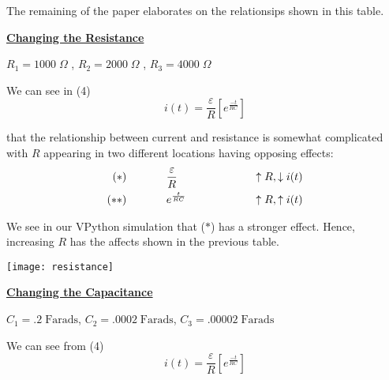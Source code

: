 \documentclass[11pt]{article}
\begin{document}
\noindent The remaining of the paper elaborates on the relationsips shown in this table. 


\newpage

\begin{center}
{\bf\underline{Changing the Resistance}}
\end{center}

\begin{center}
$R_1=1000\;\Omega$ , $R_2=2000\;\Omega$ , $R_3=4000\;\Omega$
\end{center}
\vspace{.1in}

\noindent We can see in (4) 
\[
i(t)=\frac{\varepsilon}{R}\left[e^{\frac{-t}{RC}}\right]
\]
\vspace{.1in}

\noindent that the relationship between current and resistance is somewhat complicated with $R$ appearing in two different locations having opposing effects:
\begin{align*}
(*)	& \hspace{.5in}\frac{\varepsilon}{R}		&& \hspace{.7in}\uparrow R, \downarrow i(t) \\
(**)	& \hspace{.5in}e^{\frac{t}{RC}} 			&& \hspace{.7in}\uparrow R, \uparrow i(t)	 
\end{align*} 

\vspace{.1in}

\noindent We see in our VPython simulation that ($*$) has a stronger effect. Hence, increasing $R$ has the affects shown in the previous table. 
\vspace{.4in}

\begin{center}
\texttt{[image: resistance]}
\end{center}

\newpage
\begin{center}
{\bf\underline{Changing the Capacitance}}
\end{center}
\begin{center}
$C_1=.2\;\text{Farads}$, $C_2=.0002\;\text{Farads}$, $C_3=.00002\;\text{Farads}$
\end{center} 
\vspace{.1in}

\noindent We can see from (4) 
\[
i(t)=\frac{\varepsilon}{R}\left[e^{\frac{-t}{RC}}\right]
\]
\end{document}
